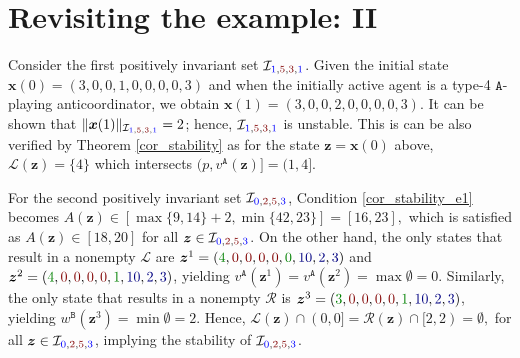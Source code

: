 \documentclass[10 pt,twocolumn,journal]{IEEEtran}
\theoremstyle{plain}
\newcommand{\A}{\mathcal{A}}
\newcommand{\I}{\mathcal{I}}
\newcommand{\R}{\mathcal{R}}
\renewcommand{\L}{\mathcal{L}}
\newcommand{\x}{\bm{x}}
\newcommand{\y}{\bm{y}}
\newcommand{\z}{\bm{z}}
\renewcommand{\A}{\mathtt{A}}
\newcommand{\B}{\mathtt{B}}
\newcommand{\tb}{\textcolor{blue}}
\newcommand{\tr}{\textcolor{Myred}}
\theoremstyle{definition}
\begin{document}
\section{Revisiting the example: II}    \label{sec_revisitingExample2}
Consider the first positively invariant set $\I_{\tb{1},\tr{5},\tr{3},\tb{1}}$.
Given the initial state $\x(0)=(3,0,0,1,0,0,0,0,3)$ and when the initially active agent is a type-4 $\A$-playing anticoordinator, we obtain $\x(1)=(3,0,0,2,0,0,0,0,3)$.
It can be shown that $\|\x(1)\|_{\I_{\tb{1},\tr{5},\tr{3},\tb{1}}}=2$; hence, $\I_{\tb{1},\tr{5},\tr{3},\tb{1}}$ is unstable. 
This is can be also verified by Theorem \ref{cor_stability} as for the state $\z=\x(0)$ above, $\L(\z)=\{4\}$ which intersects $(p,v^{\A}(\z)]=(1,4]$.

For the second positively invariant set $\I_{\tb{0}, \tr{2}, \tr{5}, \tb{3}}$, Condition \eqref{cor_stability_e1} becomes
$
    A(\z)\in[\max\{9,14\}+2, \min\{42,23\}]=[16,23],
$
which is satisfied as $A(\z)\in[18,20]$ for all $\z\in\I_{\tb{0}, \tr{2}, \tr{5}, \tb{3}}$.
On the other hand, the only states that result in a nonempty $\L$ are
$\z^1=({\color{Mygreen}4}, {\color{Myred}0}, {\color{Myred}0}, {\color{Myred}0}, {\color{Myred}0}, {\color{Mygreen}0}, {\color{Myblue}10}, {\color{Myblue}2}, {\color{Myblue}3})$ and  
$\z^2=({\color{Mygreen}4}, {\color{Myred}0}, {\color{Myred}0}, {\color{Myred}0}, {\color{Myred}0}, {\color{Mygreen}1}, {\color{Myblue}10}, {\color{Myblue}2}, {\color{Myblue}3})$, yielding $v^{\A}(\z^1) = v^{\A}(\z^2) = \max\emptyset=0$.
Similarly, the only state that results in a nonempty $\R$ is 
$\z^3=({\color{Mygreen}3}, {\color{Myred}0}, {\color{Myred}0}, {\color{Myred}0}, {\color{Myred}0}, {\color{Mygreen}1}, {\color{Myblue}10}, {\color{Myblue}2}, {\color{Myblue}3})$, yielding
$w^{\B}(\z^3) = \min\emptyset = 2$.
Hence, 
$
    \L(\z)\cap(0,0] =
    \R(\z)\cap[2,2) = \emptyset,
$ for all $\z\in\I_{\tb{0}, \tr{2}, \tr{5}, \tb{3}}$,
implying the stability of $\I_{\tb{0}, \tr{2}, \tr{5}, \tb{3}}$.
\end{document}
